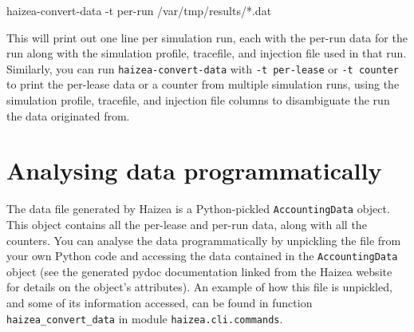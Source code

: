 \begin{shellverbatim}
haizea-convert-data -t per-run /var/tmp/results/*.dat
\end{shellverbatim}

This will print out one line per simulation run, each with the per-run data for the run along with the simulation profile, tracefile, and injection file used in that run. Similarly, you can run \texttt{haizea-convert-data} with \texttt{-t per-lease} or \texttt{-t counter} to print the per-lease data or a counter from multiple simulation runs, using the simulation profile, tracefile, and injection file columns to disambiguate the run the data originated from.

\section{Analysing data programmatically} 

The data file generated by Haizea is a Python-pickled \texttt{AccountingData} object. This object contains all the per-lease and per-run data, along with all the counters. You can analyse the data programmatically by unpickling the file from your own Python code and accessing the data contained in the \texttt{AccountingData} object (see the generated pydoc documentation linked from the Haizea website for details on the object's attributes). An example of how this file is unpickled, and some of its information accessed, can be found in function \texttt{haizea\_convert\_data} in module \texttt{haizea.cli.commands}.


